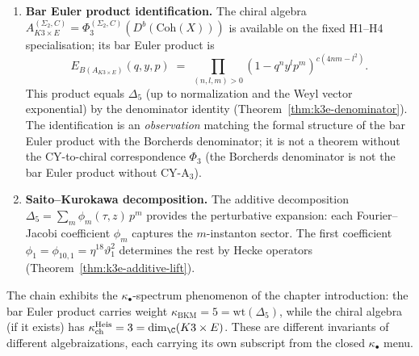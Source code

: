 \begin{enumerate}[label=\textup{Step \arabic*.}]
\item \textbf{Bar Euler product identification.}
The chiral algebra
$A_{K3 \times E}^{(\Sigma_2,C)} = \Phi_3^{(\Sigma_2,C)}(D^b(\mathrm{Coh}(X)))$ is available on the fixed H1--H4 specialisation; its
bar Euler product is
\[
E_{B(A_{K3 \times E})}(q, y, p)
\;=\;
\prod_{(n,l,m) > 0}
(1 - q^n y^l p^m)^{c(4nm - l^2)}.
\]
This product equals $\Delta_5$ (up to normalization and the Weyl
vector exponential) by the denominator identity
(Theorem~\ref{thm:k3e-denominator}).
The identification is an \emph{observation} matching the formal
structure of the bar Euler product with the Borcherds denominator;
it is not a theorem without the CY-to-chiral correspondence $\Phi_3$
(the Borcherds denominator is not the bar Euler product
without CY-A$_3$).

\item \textbf{Saito--Kurokawa decomposition.}
The additive decomposition
$\Delta_5 = \sum_m \phi_m(\tau, z) \, p^m$
provides the perturbative expansion: each Fourier--Jacobi
coefficient $\phi_m$ captures the $m$-instanton sector.
The first coefficient $\phi_1 = \phi_{10,1} = \eta^{18}\vartheta_1^2$
determines the rest by Hecke operators
(Theorem~\ref{thm:k3e-additive-lift}).
\end{enumerate}

The chain exhibits the $\kappa_\bullet$-spectrum phenomenon
of the chapter introduction:
the bar Euler product carries weight
$\kappa_{\mathrm{BKM}} = 5 = \mathrm{wt}(\Delta_5)$,
while the chiral algebra (if it exists) has
$\kappa_{\mathrm{ch}}^{\mathrm{Heis}} = 3 = \dim_\C(K3 \times E)$.
These are different invariants of different algebraizations, each carrying its own subscript from the closed $\kappa_\bullet$ menu.

